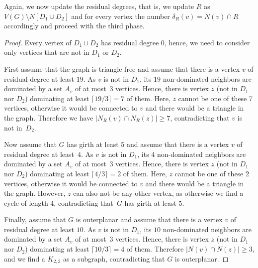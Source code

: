 Again, we now update the residual degrees, that is, we update
$R$ as $V(G)\setminus N[D_1\cup D_2]$ and for every vertex the
number $\delta_R(v)=N(v)\cap R$ accordingly and proceed with
the third phase.

\begin{proof}
  Every vertex of $D_1\cup D_2$ has residual degree $0$, hence, we
  need to consider only vertices that are not in $D_1$ or $D_2$.

  First assume that the graph is triangle-free and
  assume that there is a vertex $v$ of residual degree at least $19$.
  As $v$ is not in $D_1$, its $19$ non-dominated
  neighbors are dominated by a
  set $A_v$ of at most~3 vertices. Hence, there is vertex $z$ (not in $D_1$
  nor $D_2$) dominating at least $\lceil 19/3\rceil = 7$ of them.
  Here, $z$ cannot be one of these 7 vertices, otherwise it would be connected
  to $v$ and there would be a triangle in the graph.
  Therefore we
  have $|N_R(v)\cap N_R(z)|\geq 7$, contradicting that $v$ is not in~$D_2$.

  Now assume that $G$ has girth at least $5$ and
  assume that there is a vertex $v$ of residual degree at least~$4$.
  As $v$ is not in $D_1$, its $4$ non-dominated
  neighbors are dominated by a
  set $A_v$ of at most~3 vertices. Hence, there is vertex $z$ (not in $D_1$
  nor $D_2$) dominating at least $\lceil 4/3\rceil = 2$ of them.
  Here, $z$ cannot be one of these 2 vertices, otherwise it would be connected
  to $v$ and there would be a triangle in the graph. However, $z$ can
  also not be any other vertex, as otherwise we find a cycle of length $4$,
  contradicting that~$G$ has girth at least $5$.

  Finally, assume that $G$ is outerplanar and
  assume that there is a vertex $v$ of residual degree at least $10$.
  As $v$ is not in $D_1$, its $10$ non-dominated
  neighbors are dominated by a
  set $A_v$ of at most~3 vertices. Hence, there is vertex $z$ (not in $D_1$
  nor $D_2$) dominating at least $\lceil 10/3\rceil = 4$ of them.
  Therefore $|N(v)\cap N(z)|\geq 3$, and we find a $K_{2,3}$ as a
  subgraph, contradicting that $G$ is outerplanar.
\end{proof}

